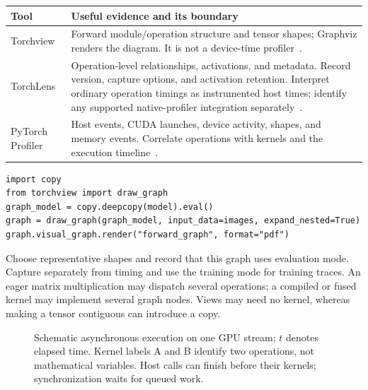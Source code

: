 \documentclass[11pt,a4paper,oneside]{report}
\begin{document}
\begin{tabularx}{\textwidth}{@{}lY@{}}
\toprule
Tool & Useful evidence and its boundary\\\midrule
Torchview & Forward module/operation structure and tensor shapes; Graphviz renders
the diagram. It is not a device-time profiler~\cite{torchview}.\\
TorchLens & Operation-level relationships, activations, and metadata. Record
version, capture options, and activation retention. Interpret ordinary operation
timings as instrumented host times; identify any supported native-profiler
integration separately~\cite{torchlens}.\\
PyTorch Profiler & Host events, CUDA launches, device activity, shapes, and memory
events. Correlate operations with kernels and the execution timeline~\cite{profiler}.\\
\bottomrule
\end{tabularx}

\begin{lstlisting}[style=python]
import copy
from torchview import draw_graph
graph_model = copy.deepcopy(model).eval()
graph = draw_graph(graph_model, input_data=images, expand_nested=True)
graph.visual_graph.render("forward_graph", format="pdf")
\end{lstlisting}
Choose representative shapes and record that this graph uses evaluation mode.
Capture separately from timing and use the training mode for training traces.
An eager matrix multiplication may dispatch several operations; a compiled or
fused kernel may implement several graph nodes. Views may need no kernel,
whereas making a tensor contiguous can introduce a copy.

\begin{figure}[h]
\centering
{}
\caption{Schematic asynchronous execution on one GPU stream; $t$ denotes
elapsed time. Kernel labels A and B identify two operations, not mathematical
variables. Host calls can finish before their kernels; synchronization waits
for queued work.}
\end{figure}
\end{document}
